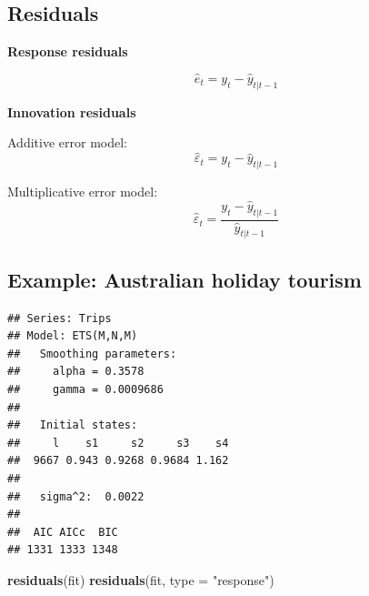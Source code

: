 \documentclass[]{book}
\newenvironment{Shaded}{\begin{snugshade}}{\end{snugshade}}
\newcommand{\DataTypeTok}[1]{\textcolor[rgb]{0.13,0.29,0.53}{#1}}
\newcommand{\KeywordTok}[1]{\textcolor[rgb]{0.13,0.29,0.53}{\textbf{#1}}}
\newcommand{\NormalTok}[1]{#1}
\newcommand{\OperatorTok}[1]{\textcolor[rgb]{0.81,0.36,0.00}{\textbf{#1}}}
\newcommand{\StringTok}[1]{\textcolor[rgb]{0.31,0.60,0.02}{#1}}
\begin{document}
\hypertarget{residuals}{%
\subsection{Residuals}\label{residuals}}

\textbf{Response residuals}

\[\hat{e}_t = y_t - \hat{y}_{t|t-1}\]

\textbf{Innovation residuals}

Additive error model:
\[\hat\varepsilon_t = y_t - \hat{y}_{t|t-1}\]

Multiplicative error model:
\[\hat\varepsilon_t = \frac{y_t - \hat{y}_{t|t-1}}{\hat{y}_{t|t-1}}\]

\hypertarget{example-australian-holiday-tourism-2}{%
\subsection{Example: Australian holiday tourism}\label{example-australian-holiday-tourism-2}}

\begin{Shaded}
\end{Shaded}

\begin{verbatim}
## Series: Trips 
## Model: ETS(M,N,M) 
##   Smoothing parameters:
##     alpha = 0.3578 
##     gamma = 0.0009686 
## 
##   Initial states:
##     l    s1     s2     s3    s4
##  9667 0.943 0.9268 0.9684 1.162
## 
##   sigma^2:  0.0022
## 
##  AIC AICc  BIC 
## 1331 1333 1348
\end{verbatim}

\begin{Shaded}
\begin{Highlighting}[]
\KeywordTok{residuals}\NormalTok{(fit)}
\KeywordTok{residuals}\NormalTok{(fit, }\DataTypeTok{type =} \StringTok{"response"}\NormalTok{)}
\end{Highlighting}
\end{Shaded}
\end{document}
